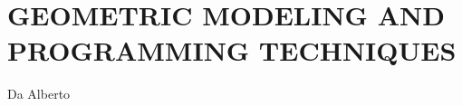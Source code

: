 \section{\uppercase{Geometric Modeling and Programming Techniques}}
\label{sec:introduction}

\noindent Da Alberto

\noindent\lipsum[2-4]


